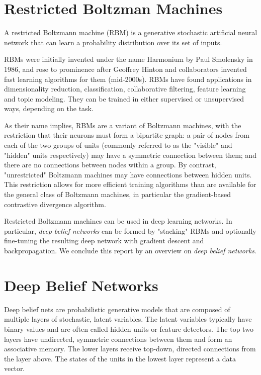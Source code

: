 \documentclass{article}
\begin{document}
\section{Restricted Boltzman Machines}
A restricted Boltzmann machine (RBM) is a generative stochastic artificial neural network that can learn a probability distribution over its set of inputs.

RBMs were initially invented under the name Harmonium by Paul Smolensky in 1986, and rose to prominence after Geoffrey Hinton and collaborators invented fast learning algorithms for them (mid-2000s). RBMs have found applications in dimensionality reduction, classification, collaborative filtering, feature learning and topic modeling. They can be trained in either supervised or unsupervised ways, depending on the task.

As their name implies, RBMs are a variant of Boltzmann machines, with the restriction that their neurons must form a bipartite graph: a pair of nodes from each of the two groups of units (commonly referred to as the "visible" and "hidden" units respectively) may have a symmetric connection between them; and there are no connections between nodes within a group. By contrast, "unrestricted" Boltzmann machines may have connections between hidden units. This restriction allows for more efficient training algorithms than are available for the general class of Boltzmann machines, in particular the gradient-based contrastive divergence algorithm.

Restricted Boltzmann machines can be used in deep learning networks. In particular, \textit{deep belief networks} can be formed by "stacking" RBMs and optionally fine-tuning the resulting deep network with gradient descent and backpropagation. We conclude this report by an overview on \textit{deep belief networks}.

\section{Deep Belief Networks}

Deep belief nets are probabilistic generative models that are composed of multiple layers of stochastic, latent variables. The latent variables typically have binary values and are often called hidden units or feature detectors. The top two layers have undirected, symmetric connections between them and form an associative memory. The lower layers receive top-down, directed connections from the layer above. The states of the units in the lowest layer represent a data vector.
\end{document}
